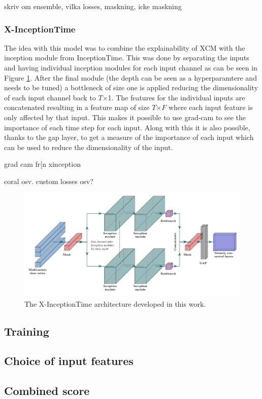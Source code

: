 skriv om ensemble, vilka losses, maskning, icke maskning

\subsubsection{X-InceptionTime}
 The idea with this model was to combine the explainability of XCM with the inception module from InceptionTime. This was done by separating the inputs and having individual inception modules for each input channel as can be seen in Figure \ref{fig:x-inception}. After the final module (the depth can be seen as a hyperparamtere and needs to be tuned) a bottleneck of size one is applied reducing the dimensionality of each input channel back to $T$$\times$1. The features for the individual inputs are concatenated resulting in a feature map of size $T$$\times$$F$ where each input feature is only affected by that input. This makes it possible to use \gls{grad-cam} to see the importance of each time step for each input. Along with this it is also possible, thanks to the \gls{gap} layer, to get a measure of the importance of each input which can be used to reduce the dimensionality of the input.

 grad cam fr[n xinception

coral osv. custom losses osv?

\begin{figure}
  \centering
  \includegraphics[width=\textwidth]{files/figs/x-inception.pdf}
  \caption{The X-InceptionTime architecture developed in this work.}
  \label{fig:x-inception}
\end{figure}

\subsection{Training}

\subsection{Choice of input features}

\subsection{Combined score}
